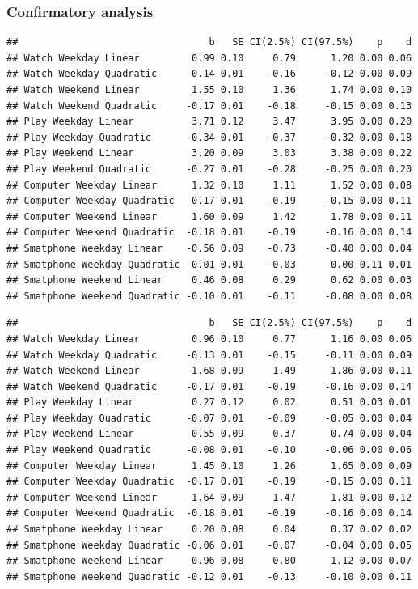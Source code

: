 \documentclass[man]{apa6}
\theoremstyle{definition}
\theoremstyle{definition}
\theoremstyle{definition}
\theoremstyle{remark}
\begin{document}
\hypertarget{confirmatory-analysis}{%
\subsubsection{Confirmatory analysis}\label{confirmatory-analysis}}

\begin{verbatim}
##                                 b   SE CI(2.5%) CI(97.5%)    p    d
## Watch Weekday Linear         0.99 0.10     0.79      1.20 0.00 0.06
## Watch Weekday Quadratic     -0.14 0.01    -0.16     -0.12 0.00 0.09
## Watch Weekend Linear         1.55 0.10     1.36      1.74 0.00 0.10
## Watch Weekend Quadratic     -0.17 0.01    -0.18     -0.15 0.00 0.13
## Play Weekday Linear          3.71 0.12     3.47      3.95 0.00 0.20
## Play Weekday Quadratic      -0.34 0.01    -0.37     -0.32 0.00 0.18
## Play Weekend Linear          3.20 0.09     3.03      3.38 0.00 0.22
## Play Weekend Quadratic      -0.27 0.01    -0.28     -0.25 0.00 0.20
## Computer Weekday Linear      1.32 0.10     1.11      1.52 0.00 0.08
## Computer Weekday Quadratic  -0.17 0.01    -0.19     -0.15 0.00 0.11
## Computer Weekend Linear      1.60 0.09     1.42      1.78 0.00 0.11
## Computer Weekend Quadratic  -0.18 0.01    -0.19     -0.16 0.00 0.14
## Smatphone Weekday Linear    -0.56 0.09    -0.73     -0.40 0.00 0.04
## Smatphone Weekday Quadratic -0.01 0.01    -0.03      0.00 0.11 0.01
## Smatphone Weekend Linear     0.46 0.08     0.29      0.62 0.00 0.03
## Smatphone Weekend Quadratic -0.10 0.01    -0.11     -0.08 0.00 0.08
\end{verbatim}

\begin{verbatim}
##                                 b   SE CI(2.5%) CI(97.5%)    p    d
## Watch Weekday Linear         0.96 0.10     0.77      1.16 0.00 0.06
## Watch Weekday Quadratic     -0.13 0.01    -0.15     -0.11 0.00 0.09
## Watch Weekend Linear         1.68 0.09     1.49      1.86 0.00 0.11
## Watch Weekend Quadratic     -0.17 0.01    -0.19     -0.16 0.00 0.14
## Play Weekday Linear          0.27 0.12     0.02      0.51 0.03 0.01
## Play Weekday Quadratic      -0.07 0.01    -0.09     -0.05 0.00 0.04
## Play Weekend Linear          0.55 0.09     0.37      0.74 0.00 0.04
## Play Weekend Quadratic      -0.08 0.01    -0.10     -0.06 0.00 0.06
## Computer Weekday Linear      1.45 0.10     1.26      1.65 0.00 0.09
## Computer Weekday Quadratic  -0.17 0.01    -0.19     -0.15 0.00 0.11
## Computer Weekend Linear      1.64 0.09     1.47      1.81 0.00 0.12
## Computer Weekend Quadratic  -0.18 0.01    -0.19     -0.16 0.00 0.14
## Smatphone Weekday Linear     0.20 0.08     0.04      0.37 0.02 0.02
## Smatphone Weekday Quadratic -0.06 0.01    -0.07     -0.04 0.00 0.05
## Smatphone Weekend Linear     0.96 0.08     0.80      1.12 0.00 0.07
## Smatphone Weekend Quadratic -0.12 0.01    -0.13     -0.10 0.00 0.11
\end{verbatim}
\end{document}
